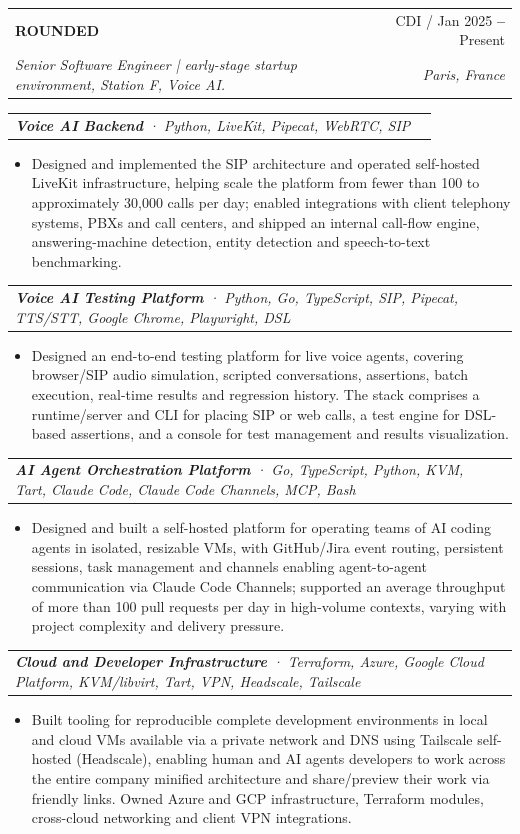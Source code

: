 \documentclass[letterpaper,11pt]{article}
\makeatletter
\newcommand{\resumeItem}[1]{
  \item\small{
    {#1 \vspace{-2pt}}
  }
}
\newcommand{\resumeSubheading}[4]{
  \vspace{-4pt}\item
    \begin{tabular*}{0.97\textwidth}[t]{l@{\extracolsep{\fill}}r}
      \textbf{#1} & \small#2 \\
      \textit{\small#3} & \textit{\small #4} \\
    \end{tabular*}\vspace{-7pt}
}
\newcommand{\resumeSubSubheading}[2]{
    \vspace{-2pt}\item
    \begin{tabular*}{0.97\textwidth}{l@{\extracolsep{\fill}}r}
      \textit{\small#1} & \textit{\small #2} \\
    \end{tabular*}\vspace{-7pt}
}
\newcommand{\resumeItemListStart}{\begin{itemize}}
\newcommand{\resumeItemListEnd}{\end{itemize}\vspace{-5pt}}
\makeatother
\begin{document}
    \resumeSubheading
    {ROUNDED}{CDI / Jan 2025 \textbf{--} Present}
    {Senior Software Engineer | early-stage startup environment, Station F, Voice AI.}{Paris, France}
    \vspace{8pt}

    \resumeSubSubheading{\textbf{Voice AI Backend} · Python, LiveKit, Pipecat, WebRTC, SIP}{}
      \resumeItemListStart
        \resumeItem{Designed and implemented the SIP architecture and operated self-hosted LiveKit infrastructure, helping scale the platform from fewer than 100 to approximately 30,000 calls per day; enabled integrations with client telephony systems, PBXs and call centers, and shipped an internal call-flow engine, answering-machine detection, entity detection and speech-to-text benchmarking.}
      \resumeItemListEnd

    \resumeSubSubheading{\textbf{Voice AI Testing Platform} · Python, Go, TypeScript, SIP, Pipecat, TTS/STT, Google Chrome, Playwright, DSL}{}
      \resumeItemListStart
        \resumeItem{Designed an end-to-end testing platform for live voice agents, covering browser/SIP audio simulation, scripted conversations, assertions, batch execution, real-time results and regression history. The stack comprises a runtime/server and CLI for placing SIP or web calls, a test engine for DSL-based assertions, and a console for test management and results visualization.}
      \resumeItemListEnd

    \resumeSubSubheading{\textbf{AI Agent Orchestration Platform} · Go, TypeScript, Python, KVM, Tart, Claude Code, Claude Code Channels, MCP, Bash}{}
      \resumeItemListStart
        \resumeItem{Designed and built a self-hosted platform for operating teams of AI coding agents in isolated, resizable VMs, with GitHub/Jira event routing, persistent sessions, task management and channels enabling agent-to-agent communication via Claude Code Channels; supported an average throughput of more than 100 pull requests per day in high-volume contexts, varying with project complexity and delivery pressure.}
      \resumeItemListEnd

    \resumeSubSubheading{\textbf{Cloud and Developer Infrastructure} · Terraform, Azure, Google Cloud Platform, KVM/libvirt, Tart, VPN, Headscale, Tailscale}{}
      \resumeItemListStart
        \resumeItem{Built tooling for reproducible complete development environments in local and cloud VMs available via a private network and DNS using Tailscale self-hosted (Headscale), enabling human and AI agents developers to work across the entire company minified architecture and share/preview their work via friendly links. Owned Azure and GCP infrastructure, Terraform modules, cross-cloud networking and client VPN integrations.}
      \resumeItemListEnd
\end{document}
